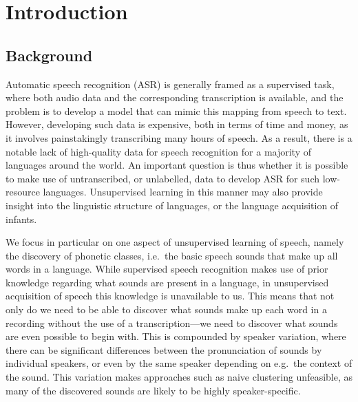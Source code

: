 %
%
%

% 

\chapter{Introduction}
\section{Background}
Automatic speech recognition (ASR) is generally framed as a supervised task, where both audio data and the corresponding transcription is available, and the problem is to develop a model that can mimic this mapping from speech to text.
However, developing such data is expensive, both in terms of time and money, as it involves painstakingly transcribing many hours of speech.
As a result, there is a notable lack of high-quality data for speech recognition for a majority of languages around the world.
An important question is thus whether it is possible to make use of untranscribed, or unlabelled, data to develop ASR for such low-resource languages.
Unsupervised learning in this manner may also provide insight into the linguistic structure of languages, or the language acquisition of infants.

We focus in particular on one aspect of unsupervised learning of speech, namely the discovery of phonetic classes, i.e.\ the basic speech sounds that make up all words in a language.
While supervised speech recognition makes use of prior knowledge regarding what sounds are present in a language, in unsupervised acquisition of speech this knowledge is unavailable to us.
This means that not only do we need to be able to discover what sounds make up each word in a recording without the use of a transcription---we need to discover what sounds are even possible to begin with.
This is compounded by speaker variation, where there can be significant differences between the pronunciation of sounds by individual speakers, or even by the same speaker depending on e.g.\ the context of the sound.
This variation makes approaches such as naive clustering unfeasible, as many of the discovered sounds are likely to be highly speaker-specific.

